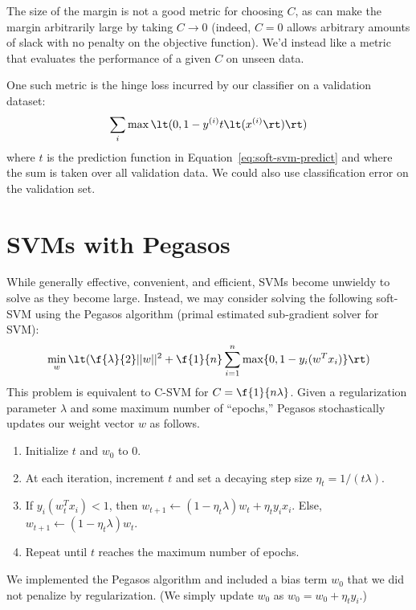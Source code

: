\documentclass{article}
\newcommand{\sind}[1]{^{(#1)}}
\begin{document}
\begin{multicols}{2}
The size of the margin
is not a good metric for choosing $C$,
as can make the margin arbitrarily large
by taking $C \to 0$
(indeed, $C = 0$ allows arbitrary amounts of slack
with no penalty on the objective function).
We'd instead like a metric that evaluates
the performance of a given $C$
on unseen data.

One such metric is the hinge loss incurred
by our classifier on a validation dataset:
\begin{equation}
    \sum_{i} \max\lt(0, 1 - y\sind{i} t\lt(x\sind{i}\rt)\rt)
\end{equation}
where $t$ is the prediction function in Equation~\ref{eq:soft-svm-predict}
and where the sum is taken over all validation data.
We could also use classification error on the validation set.



\section{SVMs with Pegasos}

While generally effective, convenient, and efficient,
SVMs become unwieldy to solve as they become large.
Instead, we may consider solving the following soft-SVM
using the Pegasos algorithm
(primal estimated sub-gradient solver for SVM):
\begin{equation}
   \min_w \lt( \f{\lambda}{2}||w||^2 + \f{1}{n}\sum_{i=1}^n{\max\{0,1-y_i(w^Tx_i)\}} \rt)
\end{equation}
This problem is equivalent to C-SVM for $C= \f{1}{n\lambda}$.
Given a regularization parameter $\lambda$
and some maximum number of ``epochs,''
Pegasos stochastically updates our weight vector $w$ as follows.
\begin{enumerate}
\item Initialize $t$ and $w_0$ to 0.
\item At each iteration, increment $t$ and set a decaying step size $\eta_t = 1/(t\lambda)$.
\item If $y_i(w_t^Tx_i)<1$, then $w_{t+1}\leftarrow(1-\eta_t\lambda)w_t+\eta_ty_ix_i$. Else,  $w_{t+1}\leftarrow(1-\eta_t\lambda)w_t$.
\item Repeat until $t$ reaches the maximum number of epochs.
\end{enumerate}
We implemented the Pegasos algorithm and included a bias term $w_0$
that we did not penalize by regularization.
(We simply update $w_0$ as $w_0 = w_0 + \eta_t y_i$.)


\end{multicols}
\end{document}
